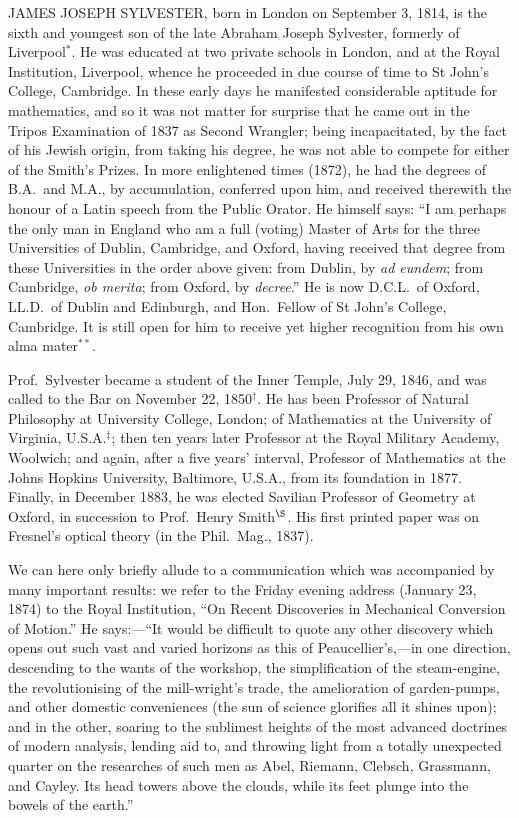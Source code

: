 \documentclass[11pt,a4paper]{book}
\begin{document}
JAMES JOSEPH SYLVESTER, born in London on September 3, 1814, is the sixth and youngest son of the late Abraham Joseph Sylvester, formerly of Liverpool$^*$. He was educated at two private schools in London, and at the Royal Institution, Liverpool, whence he proceeded in due course of time to St John's College, Cambridge. In these early days he manifested considerable aptitude for mathematics, and so it was not matter for surprise that he came out in the Tripos Examination of 1837 as Second Wrangler; being incapacitated, by the fact of his Jewish origin, from taking his degree, he was not able to compete for either of the Smith's Prizes. In more enlightened times (1872), he had the degrees of B.A.\ and M.A., by accumulation, conferred upon him, and received therewith the honour of a Latin speech from the Public Orator. He himself says: ``I am perhaps the only man in England who am a full (voting) Master of Arts for the three Universities of Dublin, Cambridge, and Oxford, having received that degree from these Universities in the order above given: from Dublin, by \textit{ad eundem}; from Cambridge, \textit{ob merita}; from Oxford, by \textit{decree}.'' He is now D.C.L.\ of Oxford, LL.D.\ of Dublin and Edinburgh, and Hon.\ Fellow of St John's College, Cambridge. It is still open for him to receive yet higher recognition from his own alma mater$^{**}$.

Prof.\ Sylvester became a student of the Inner Temple, July 29, 1846, and was called to the Bar on November 22, 1850$^\dagger$. He has been Professor of Natural Philosophy at University College, London; of Mathematics at the University of Virginia, U.S.A.$^\ddagger$; then ten years later Professor at the Royal Military Academy, Woolwich; and again, after a five years' interval, Professor of Mathematics at the Johns Hopkins University, Baltimore, U.S.A., from its foundation in 1877. Finally, in December 1883, he was elected Savilian Professor of Geometry at Oxford, in succession to Prof.\ Henry Smith$^\S$. His first printed paper was on Fresnel's optical theory (in the Phil.\ Mag., 1837).

We can here only briefly allude to a communication which was accompanied by many important results: we refer to the Friday evening address (January 23, 1874) to the Royal Institution, ``On Recent Discoveries in Mechanical Conversion of Motion.'' He says:---``It would be difficult to quote any other discovery which opens out such vast and varied horizons as this of Peaucellier's,---in one direction, descending to the wants of the workshop, the simplification of the steam-engine, the revolutionising of the mill-wright's trade, the amelioration of garden-pumps, and other domestic conveniences (the sun of science glorifies all it shines upon); and in the other, soaring to the sublimest heights of the most advanced doctrines of modern analysis, lending aid to, and throwing light from a totally unexpected quarter on the researches of such men as Abel, Riemann, Clebsch, Grassmann, and Cayley. Its head towers above the clouds, while its feet plunge into the bowels of the earth.''
\end{document}
